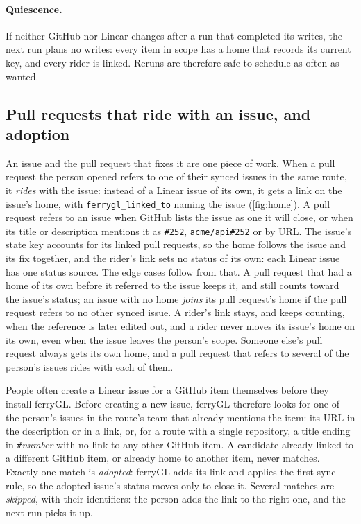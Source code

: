 \documentclass[11pt,a4paper]{article}
\newcommand{\ferry}{ferryGL}
\newcommand{\code}[1]{\texttt{#1}}
\newcommand{\key}[1]{\texttt{#1}}
\begin{document}
\paragraph{Quiescence.} If neither GitHub nor Linear changes after a run that completed its
writes, the next run plans no writes: every item in scope has a home that records its current
key, and every rider is linked. Reruns are therefore safe to schedule as often as wanted.

\subsection{Pull requests that ride with an issue, and adoption}
\label{sec:riders}

An issue and the pull request that fixes it are one piece of work. When a pull request the
person opened refers to one of their synced issues in the same route, it \emph{rides} with the
issue: instead of a Linear issue of its own, it gets a link on the issue's home, with
\key{ferrygl\_linked\_to} naming the issue (\cref{fig:home}). A pull request refers to an issue
when GitHub lists the issue as one it will close, or when its title or description mentions it
as \code{\#252}, \code{acme/api\#252} or by URL. The issue's state key accounts for its linked
pull requests, so the home follows the issue and its fix together, and the rider's link sets no
status of its own: each Linear issue has one status source. The edge cases follow from that.
A pull request that had a home of its own before it referred to the issue keeps it, and still
counts toward the issue's status; an issue with no home \emph{joins} its pull request's home if
the pull request refers to no other synced issue. A rider's link stays, and keeps counting, when
the reference is later edited out, and a rider never moves its issue's home on its own, even
when the issue leaves the person's scope. Someone else's pull request always gets its own home,
and a pull request that refers to several of the person's issues rides with each of them.

People often create a Linear issue for a GitHub item themselves before they install \ferry.
Before creating a new issue, \ferry{} therefore looks for one of the person's issues in the
route's team that already mentions the item: its URL in the description or in a link, or, for a
route with a single repository, a title ending in \code{\#}\emph{number} with no link to any
other GitHub item. A candidate already linked to a different GitHub item, or already home to
another item, never matches. Exactly one match is \emph{adopted}: \ferry{} adds its link and
applies the first-sync rule, so the adopted issue's status moves only to close it. Several
matches are \emph{skipped}, with their identifiers: the person adds the link to the right one,
and the next run picks it up.
\end{document}
